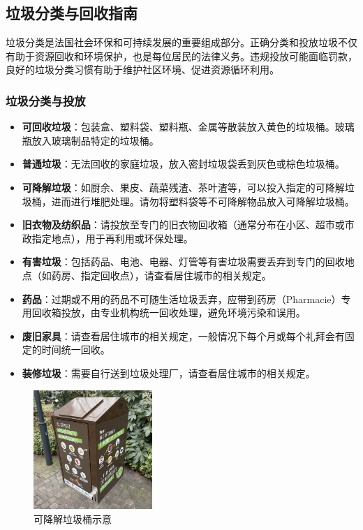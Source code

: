 \subsection{垃圾分类与回收指南}

垃圾分类是法国社会环保和可持续发展的重要组成部分。正确分类和投放垃圾不仅有助于资源回收和环境保护，也是每位居民的法律义务。违规投放可能面临罚款，良好的垃圾分类习惯有助于维护社区环境、促进资源循环利用。

\subsubsection{垃圾分类与投放}
\begin{itemize}
    \item \textbf{可回收垃圾}：包装盒、塑料袋、塑料瓶、金属等散装放入黄色的垃圾桶。玻璃瓶放入玻璃制品特定的垃圾桶。
    \item \textbf{普通垃圾}：无法回收的家庭垃圾，放入密封垃圾袋丢到灰色或棕色垃圾桶。
    \item \textbf{可降解垃圾}：如厨余、果皮、蔬菜残渣、茶叶渣等，可以投入指定的可降解垃圾桶，进而进行堆肥处理。请勿将塑料袋等不可降解物品放入可降解垃圾桶。
    \item \textbf{旧衣物及纺织品}：请投放至专门的旧衣物回收箱（通常分布在小区、超市或市政指定地点），用于再利用或环保处理。
    \item \textbf{有害垃圾}：包括药品、电池、电器、灯管等有害垃圾需要丢弃到专门的回收地点（如药房、指定回收点），请查看居住城市的相关规定。
    \item \textbf{药品}：过期或不用的药品不可随生活垃圾丢弃，应带到药房（Pharmacie）专用回收箱投放，由专业机构统一回收处理，避免环境污染和误用。
    \item \textbf{废旧家具}：请查看居住城市的相关规定，一般情况下每个月或每个礼拜会有固定的时间统一回收。
    \item \textbf{装修垃圾}：需要自行送到垃圾处理厂，请查看居住城市的相关规定。
\end{itemize}

\begin{figure}[h]
    \centering
    \includegraphics[width=0.4\textwidth]{chapters/06_life/images/garbage_bin_biodegradable.jpg}
    \caption{可降解垃圾桶示意}
\end{figure}

